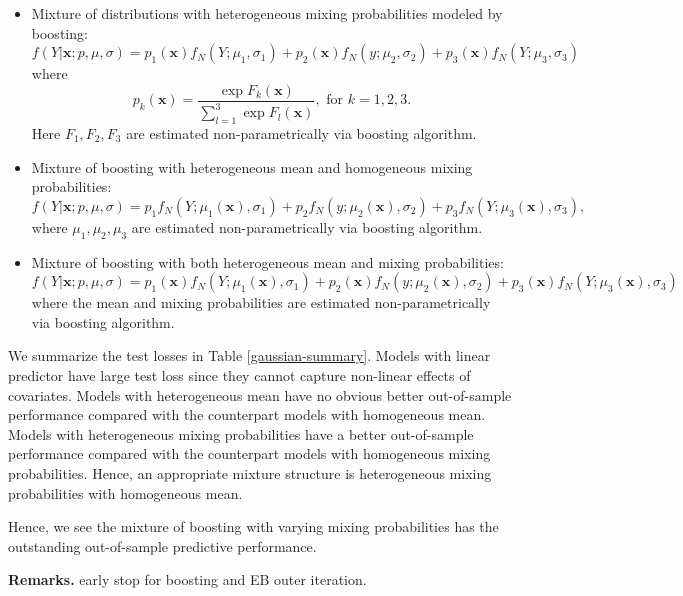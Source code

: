 \documentclass[11pt]{article}
\numberwithin{equation}{section}
\def\bx{\boldsymbol{x}}
\begin{document}
\begin{itemize}
\item Mixture of distributions with heterogeneous mixing probabilities modeled by boosting:
\begin{equation}
	f(Y|\bx;p,\mu,\sigma)=p_1(\bx)f_N(Y;\mu_1,\sigma_1)+p_2(\bx)f_N(y;\mu_2,\sigma_2)+p_3(\bx)f_N(Y;\mu_3,\sigma_3)
\end{equation}
where
\begin{equation}\label{bst-p}
	p_k(\bx)=\frac{\exp{F_k(\bx)}}{\sum_{l=1}^{3}\exp{F_l(\bx)}}, \text{ for } k=1,2,3.
\end{equation}
Here $F_1,F_2,F_3$ are estimated non-parametrically via boosting algorithm.

\item Mixture of boosting with heterogeneous mean and homogeneous mixing probabilities:
\begin{equation}\label{bst-mu}
	f(Y|\bx;p,\mu,\sigma)=p_1f_N(Y;\mu_1(\bx),\sigma_1)+p_2f_N(y;\mu_2(\bx),\sigma_2)+p_3f_N(Y;\mu_3(\bx),\sigma_3),
\end{equation}
where $\mu_1,\mu_2,\mu_3$ are estimated non-parametrically via boosting algorithm.

\item Mixture of boosting with both heterogeneous mean and mixing probabilities:
\begin{equation}\label{bst-both}
	f(Y|\bx;p,\mu,\sigma)=p_1(\bx)f_N(Y;\mu_1(\bx),\sigma_1)+p_2(\bx)f_N(y;\mu_2(\bx),\sigma_2)+p_3(\bx)f_N(Y;\mu_3(\bx),\sigma_3)
\end{equation}
where the mean and mixing probabilities are estimated non-parametrically via boosting algorithm.

\end{itemize}
We summarize the test losses in Table \ref{gaussian-summary}. 
Models with linear predictor have large test loss since they cannot capture non-linear effects of covariates.
Models with heterogeneous mean have no obvious better out-of-sample performance compared with the counterpart models with homogeneous mean.
Models with heterogeneous mixing probabilities have a better out-of-sample performance compared with the counterpart models with homogeneous mixing probabilities.
Hence, an appropriate mixture structure is heterogeneous mixing probabilities with homogeneous mean. 

Hence, we see the mixture of boosting with varying mixing probabilities has the outstanding out-of-sample predictive performance.

{\bf Remarks.} early stop for boosting and EB outer iteration.
\end{document}
